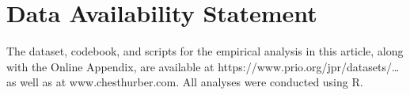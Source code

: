 \documentclass[
  letterpaper,
  DIV=11,
  numbers=noendperiod]{scrartcl}
\begin{document}
\section{Data Availability Statement}\label{data-availability-statement}

The dataset, codebook, and scripts for the empirical analysis in this
article, along with the Online Appendix, are available at
https://www.prio.org/jpr/datasets/\ldots{} as well as at
www.chesthurber.com. All analyses were conducted using R.


\printbibliography[title=References]
\end{document}
